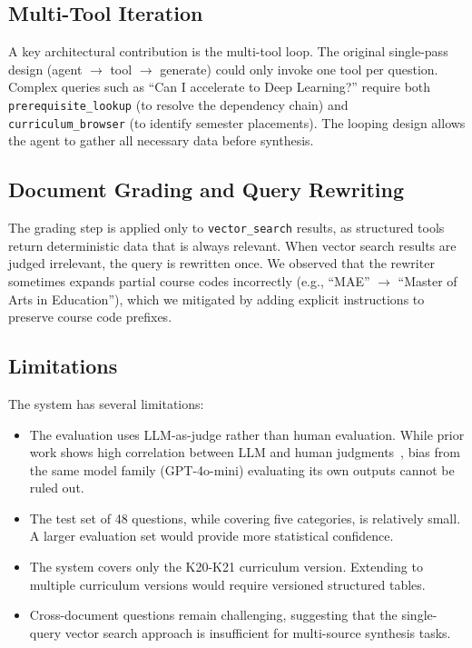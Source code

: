 \documentclass[lettersize,journal]{IEEEtran}
\begin{document}
\subsection{Multi-Tool Iteration}

A key architectural contribution is the multi-tool loop. The original single-pass design (agent $\rightarrow$ tool $\rightarrow$ generate) could only invoke one tool per question. Complex queries such as ``Can I accelerate to Deep Learning?'' require both \texttt{prerequisite\_lookup} (to resolve the dependency chain) and \texttt{curriculum\_browser} (to identify semester placements). The looping design allows the agent to gather all necessary data before synthesis.

\subsection{Document Grading and Query Rewriting}

The grading step is applied only to \texttt{vector\_search} results, as structured tools return deterministic data that is always relevant. When vector search results are judged irrelevant, the query is rewritten once. We observed that the rewriter sometimes expands partial course codes incorrectly (e.g., ``MAE'' $\rightarrow$ ``Master of Arts in Education''), which we mitigated by adding explicit instructions to preserve course code prefixes.

\subsection{Limitations}

The system has several limitations:
\begin{itemize}
    \item The evaluation uses LLM-as-judge rather than human evaluation. While prior work shows high correlation between LLM and human judgments~\cite{ref_llm_judge}, bias from the same model family (GPT-4o-mini) evaluating its own outputs cannot be ruled out.
    \item The test set of 48 questions, while covering five categories, is relatively small. A larger evaluation set would provide more statistical confidence.
    \item The system covers only the K20-K21 curriculum version. Extending to multiple curriculum versions would require versioned structured tables.
    \item Cross-document questions remain challenging, suggesting that the single-query vector search approach is insufficient for multi-source synthesis tasks.
\end{itemize}
\end{document}
